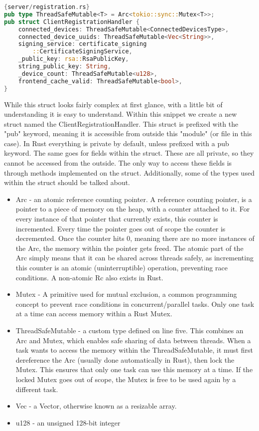 \begin{lstlisting}[language=Rust, style=boxed]{server/registration.rs}
pub type ThreadSafeMutable<T> = Arc<tokio::sync::Mutex<T>>;
pub struct ClientRegistrationHandler {
    connected_devices: ThreadSafeMutable<ConnectedDevicesType>,
    connected_device_uuids: ThreadSafeMutable<Vec<String>>,
    signing_service: certificate_signing
        ::CertificateSigningService,
    _public_key: rsa::RsaPublicKey,
    string_public_key: String,
    _device_count: ThreadSafeMutable<u128>,
    frontend_cache_valid: ThreadSafeMutable<bool>,
}
\end{lstlisting}
While this struct looks fairly complex at first glance, with a little bit of understanding it is easy to understand. Within this snippet we create a new struct named the ClientRegistrationHandler. This struct is prefixed with the "pub" keyword, meaning it is accessible from outside this "module" (or file in this case). In Rust everything is private by default, unless prefixed with a pub keyword. The same goes for fields within the struct. These are all private, so they cannot be accessed from the outside. The only way to access these fields is through methods implemented on the struct. Additionally, some of the types used within the struct should be talked about. 
\begin{itemize}
    \item Arc - an atomic reference counting pointer. A reference counting pointer, is a pointer to a piece of memory on the heap, with a counter attached to it. For every instance of that pointer that currently exists, this counter is incremented. Every time the pointer goes out of scope the counter is decremented. Once the counter hits 0, meaning there are no more instances of the Arc, the memory within the pointer gets freed. The atomic part of the Arc simply means that it can be shared across threads safely, as incrementing this counter is an atomic (uninterruptible) operation, preventing race conditions. A non-atomic Rc also exists in Rust.
    \item Mutex - A primitive used for mutual exclusion, a common programming concept to prevent race conditions in concurrent/parallel tasks. Only one task at a time can access memory within a Rust Mutex.
    \item ThreadSafeMutable - a custom type defined on line five. This combines an Arc and Mutex, which enables safe sharing of data between threads. When a task wants to access the memory within the ThreadSafeMutable, it must first dereference the Arc (usually done automatically in Rust), then  lock the Mutex. This ensures that only one task can use this memory at a time. If the locked Mutex goes out of scope, the Mutex is free to be used again by a different task.
    \item Vec - a Vector, otherwise known as a resizable array.
    \item u128 - an unsigned 128-bit integer
\end{itemize}
